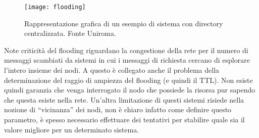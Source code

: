 \begin{figure}[H]
 \centering
 \texttt{[image: flooding]}
 \caption{Rappresentazione grafica di un esempio di sistema con
  directory centralizzata. Fonte Uniroma.}
\end{figure}

Note criticità del flooding riguardano la congestione della rete per il numero
di messaggi scambiati da sistemi in cui i messaggi di richiesta cercano di
esplorare l'intero insieme dei nodi. A questo è collegato anche il problema
della determinazione del raggio di ampiezza del flooding (e quindi il TTL). Non
esiste  quindi garanzia che venga interrogato il nodo che possiede la risorsa
pur sapendo che questa  esiste nella rete. Un'altra limitazione di questi
sistemi risiede nella nozione di ``vicinanza'' dei nodi, non è chiaro infatto
come definire questo  parametro, è spesso necessario effettuare dei  tentativi
per stabilire quale sia il valore migliore per un determinato sistema.
